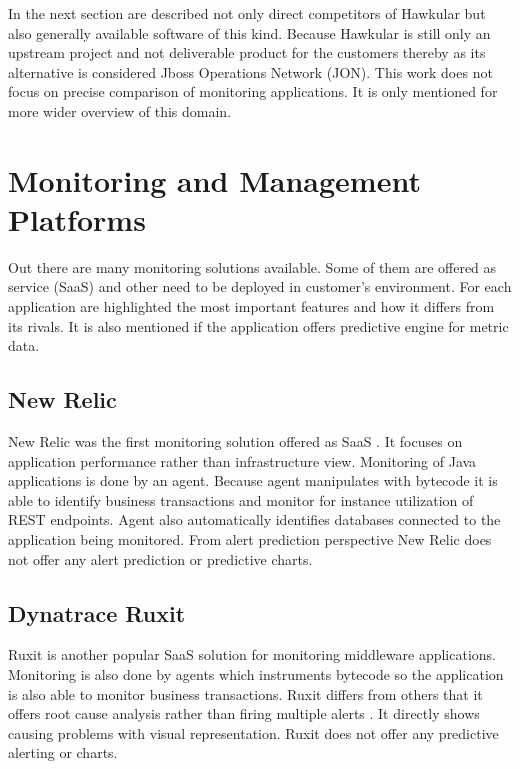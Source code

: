 In the next section are described not only direct competitors of Hawkular but also
generally available software of this kind. Because Hawkular is still only an upstream project and not deliverable
product for the customers thereby as its alternative is considered Jboss Operations Network (JON). This work does not
focus on precise comparison of monitoring applications. It is only mentioned for more wider overview of this domain.

    \section{Monitoring and Management Platforms}
    Out there are many monitoring solutions available. Some of them are offered as service (SaaS) and other need to be
    deployed in customer's environment. For each application are highlighted the most important features and how it
    differs from its rivals. It is also mentioned if the application offers predictive engine for metric data.

        \subsection{New Relic}
        New Relic was the first monitoring solution offered as SaaS \cite{new-relic}. It focuses on application
        performance rather than infrastructure view. Monitoring of Java applications is done by an agent. Because
        agent manipulates with bytecode it is able to identify business transactions and monitor for instance
        utilization of REST endpoints. Agent also automatically identifies databases connected to the application
        being monitored. From alert prediction perspective New Relic does not offer any alert prediction or
        predictive charts.

        \subsection{Dynatrace Ruxit}
        Ruxit is another popular SaaS solution for monitoring middleware applications. Monitoring is also done by agents
        which instruments bytecode so the application is also able to monitor business transactions. Ruxit differs from
        others that it offers root cause analysis rather than firing multiple alerts \cite{ruxit}. It directly shows
        causing problems with visual representation. Ruxit does not offer any predictive alerting or charts.

